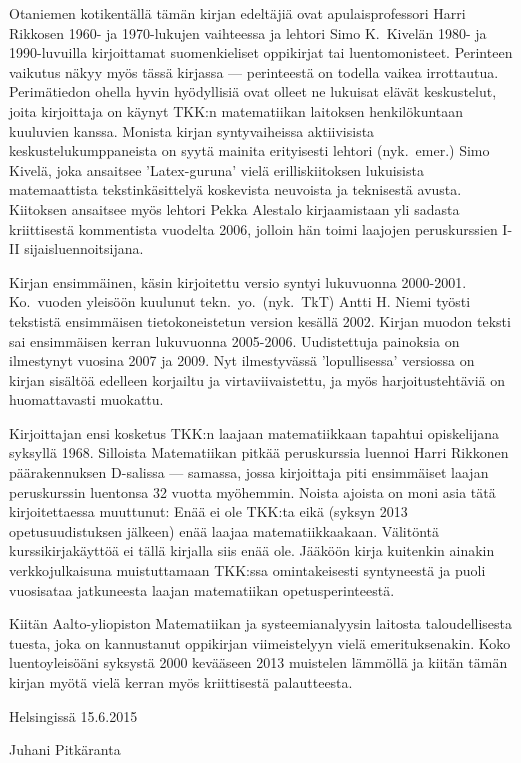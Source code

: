 Otaniemen kotikentällä tämän kirjan edeltäjiä ovat apulaisprofessori Harri Rikkosen 1960- ja
1970-lukujen vaihteessa ja lehtori Simo K.\ Kivelän 1980- ja 1990-luvuilla kirjoittamat 
suomenkieliset oppikirjat tai luentomonisteet. Perinteen vaikutus näkyy myös tässä kirjassa
--- perinteestä on todella vaikea irrottautua. Perimätiedon ohella hyvin hyödyllisiä ovat
olleet ne lukuisat elävät keskustelut, joita kirjoittaja on käynyt TKK:n matematiikan
laitoksen henkilökuntaan kuuluvien kanssa. Monista kirjan syntyvaiheissa aktiivisista
keskustelukumppaneista on syytä mainita erityisesti lehtori (nyk.\ emer.) Simo Kivelä, joka
ansaitsee 'Latex-guruna' vielä erilliskiitoksen lukuisista matemaattista tekstinkäsittelyä
koskevista neuvoista ja teknisestä avusta. Kiitoksen ansaitsee myös lehtori Pekka
Alestalo kirjaamistaan yli sadasta kriittisestä kommentista vuodelta 2006, jolloin hän toimi
laajojen peruskurssien I-II sijaisluennoitsijana.

Kirjan ensimmäinen, käsin kirjoitettu versio syntyi lukuvuonna 2000-2001. Ko.\ vuoden
yleisöön kuulunut tekn.\ yo.\ (nyk.\ TkT) Antti H. Niemi työsti tekstistä ensimmäisen
tietokoneistetun version kesällä 2002. Kirjan muodon teksti sai ensimmäisen kerran
lukuvuonna 2005-2006. Uudistettuja painoksia on ilmestynyt vuosina 2007 ja 2009. Nyt
ilmestyvässä 'lopullisessa' versiossa on kirjan sisältöä edelleen korjailtu ja
virtaviivaistettu, ja myös harjoitustehtäviä on huomattavasti muokattu.

Kirjoittajan ensi kosketus TKK:n laajaan matematiikkaan tapahtui opiskelijana syksyllä 1968.
Silloista Matematiikan pitkää peruskurssia luennoi Harri Rikkonen päärakennuksen D-salissa
--- samassa, jossa kirjoittaja piti ensimmäiset laajan peruskurssin luentonsa 32 vuotta
myöhemmin. Noista ajoista on moni asia tätä kirjoitettaessa muuttunut: Enää ei ole TKK:ta
eikä (syksyn 2013 opetusuudistuksen jälkeen) enää laajaa matematiikkaakaan. Välitöntä
kurssikirjakäyttöä ei tällä kirjalla siis enää ole. Jääköön kirja kuitenkin ainakin
verkkojulkaisuna muistuttamaan TKK:ssa omintakeisesti syntyneestä ja puoli vuosisataa
jatkuneesta laajan matematiikan opetusperinteestä.

Kiitän Aalto-yliopiston Matematiikan ja systeemianalyysin laitosta taloudellisesta tuesta, joka
on kannustanut oppikirjan viimeistelyyn vielä emerituksenakin. Koko luentoyleisöäni syksystä
2000 kevääseen 2013 muistelen lämmöllä ja kiitän tämän kirjan myötä vielä kerran myös
kriittisestä palautteesta.

Helsingissä 15.6.2015

Juhani Pitkäranta

  
